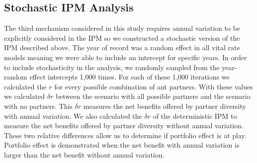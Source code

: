\documentclass[11pt]{article}\usepackage[sc]{mathpazo} %
\begin{document}
  \subsection*{Stochastic IPM Analysis}
  The third mechanism considered in this study requires annual variation to be explicitly considered in the IPM so we constructed a stochastic version of the IPM described above. 
The year of record was a random effect in all vital rate models meaning we were able to include an intercept for specific years. 
In order to include stochasticity in the analysis, we randomly sampled from the year-random effect intercepts 1,000 times.
For each of these 1,000 iterations we calculated the $r$ for every possible combination of ant partners. 
With these values we calculated $\delta r$ between the scenario with all possible partners and the scenario with no partners.
This $\delta r$ measures the net benefits offered by partner diversity with annual variation.
We also calculated the $\delta r$ of the deterministic IPM to measure the net benefits offered by partner diversity without annual variation. 
These two relative differences allow us to determine if portfolio effect is at play.
Portfolio effect is demonstrated when the net benefit with annual variation is larger than the net benefit without annual variation. 
		
\end{document}

